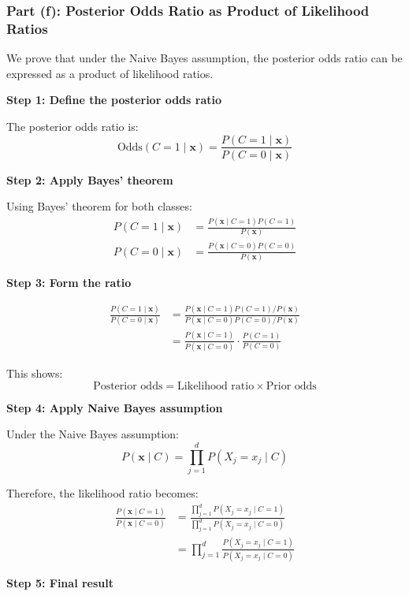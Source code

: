 \documentclass[12pt]{article}
\begin{document}
\subsubsection{Part (f): Posterior Odds Ratio as Product of Likelihood Ratios}

\begin{solution}
We prove that under the Naive Bayes assumption, the posterior odds ratio can be expressed as a product of likelihood ratios.

\textbf{Step 1: Define the posterior odds ratio}

The posterior odds ratio is:
\[
\text{Odds}(C=1 \mid \mathbf{x}) = \frac{P(C=1 \mid \mathbf{x})}{P(C=0 \mid \mathbf{x})}
\]

\textbf{Step 2: Apply Bayes' theorem}

Using Bayes' theorem for both classes:
\begin{align}
P(C=1 \mid \mathbf{x}) &= \frac{P(\mathbf{x} \mid C=1) P(C=1)}{P(\mathbf{x})} \\
P(C=0 \mid \mathbf{x}) &= \frac{P(\mathbf{x} \mid C=0) P(C=0)}{P(\mathbf{x})}
\end{align}

\textbf{Step 3: Form the ratio}

\begin{align}
\frac{P(C=1 \mid \mathbf{x})}{P(C=0 \mid \mathbf{x})} &= \frac{P(\mathbf{x} \mid C=1) P(C=1) / P(\mathbf{x})}{P(\mathbf{x} \mid C=0) P(C=0) / P(\mathbf{x})} \\
&= \frac{P(\mathbf{x} \mid C=1)}{P(\mathbf{x} \mid C=0)} \cdot \frac{P(C=1)}{P(C=0)}
\end{align}

This shows:
\[
\boxed{\text{Posterior odds} = \text{Likelihood ratio} \times \text{Prior odds}}
\]

\textbf{Step 4: Apply Naive Bayes assumption}

Under the Naive Bayes assumption:
\[
P(\mathbf{x} \mid C) = \prod_{j=1}^{d} P(X_j = x_j \mid C)
\]

Therefore, the likelihood ratio becomes:
\begin{align}
\frac{P(\mathbf{x} \mid C=1)}{P(\mathbf{x} \mid C=0)} &= \frac{\prod_{j=1}^{d} P(X_j = x_j \mid C=1)}{\prod_{j=1}^{d} P(X_j = x_j \mid C=0)} \\
&= \prod_{j=1}^{d} \frac{P(X_j = x_j \mid C=1)}{P(X_j = x_j \mid C=0)}
\end{align}

\textbf{Step 5: Final result}


\end{solution}
\end{document}
